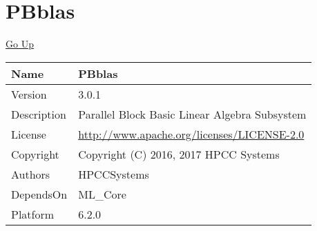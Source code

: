 \chapter*{\color{headtoc} PBblas}
\hypertarget{ecldoc:toc:root/PBblas}{}
\hyperlink{ecldoc:toc:root}{Go Up}

\begin{tabularx}{\textwidth}{|l|X|}
\hline
Name &
PBblas
 \\
\hline
Version &
3.0.1
 \\
\hline
Description &
Parallel Block Basic Linear Algebra Subsystem
 \\
\hline
License &
\url{http://www.apache.org/licenses/LICENSE-2.0}
 \\
\hline
Copyright &
Copyright (C) 2016, 2017 HPCC Systems
 \\
\hline
Authors &
HPCCSystems
 \\
\hline
DependsOn &
ML\_Core
 \\
\hline
Platform &
6.2.0
 \\
\hline
\end{tabularx}

